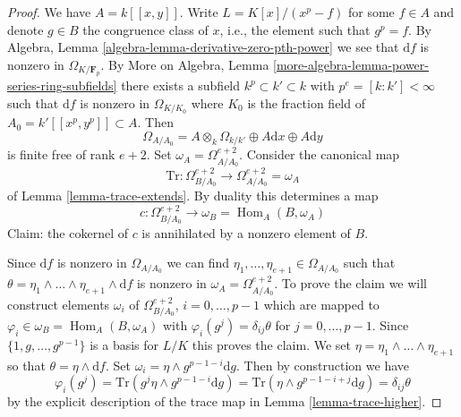 \documentclass{stacks-project}
\theoremstyle{plain}
\theoremstyle{definition}
\theoremstyle{remark}
\numberwithin{equation}{subsection}
\def\Hom{\mathop{\mathrm{Hom}}\nolimits}
\begin{document}
\begin{proof}
We have $A = k[[x, y]]$. Write $L = K[x]/(x^p - f)$ for some $f \in A$
and denote $g \in B$ the congruence class of $x$, i.e., the element such
that $g^p = f$. By Algebra, Lemma \ref{algebra-lemma-derivative-zero-pth-power}
we see that $\text{d}f$ is nonzero in $\Omega_{K/\mathbf{F}_p}$. By
More on Algebra, Lemma \ref{more-algebra-lemma-power-series-ring-subfields}
there exists a subfield $k^p \subset k' \subset k$ with
$p^e = [k : k'] < \infty$ such that $\text{d}f$ is nonzero
in $\Omega_{K/K_0}$ where $K_0$ is the fraction field of
$A_0 = k'[[x^p, y^p]] \subset A$. Then
$$
\Omega_{A/A_0} =
A \otimes_k \Omega_{k/k'} \oplus A \text{d}x \oplus A \text{d}y
$$
is finite free of rank $e + 2$. Set $\omega_A = \Omega^{e + 2}_{A/A_0}$.
Consider the canonical map
$$
\text{Tr} :
\Omega^{e + 2}_{B/A_0}
\longrightarrow
\Omega^{e + 2}_{A/A_0} = \omega_A
$$
of Lemma \ref{lemma-trace-extends}. By duality this determines a map
$$
c : \Omega^{e + 2}_{B/A_0} \to \omega_B = \Hom_A(B, \omega_A)
$$
Claim: the cokernel of $c$ is annihilated by a nonzero element of $B$.

\medskip\noindent
Since $\text{d}f$ is nonzero in $\Omega_{A/A_0}$ we can find
$\eta_1, \ldots, \eta_{e + 1} \in \Omega_{A/A_0}$ such that
$\theta = \eta_1 \wedge \ldots \wedge \eta_{e + 1} \wedge \text{d}f$ is
nonzero in $\omega_A = \Omega^{e + 2}_{A/A_0}$. To prove the claim we
will construct elements $\omega_i$ of $\Omega^{e + 2}_{B/A_0}$,
$i = 0, \ldots, p - 1$ which are mapped to
$\varphi_i \in \omega_B = \Hom_A(B, \omega_A)$
with $\varphi_i(g^j) = \delta_{ij}\theta$ for $j = 0, \ldots, p - 1$.
Since $\{1, g, \ldots, g^{p - 1}\}$ is a basis for $L/K$ this
proves the claim. We set
$\eta = \eta_1 \wedge \ldots \wedge \eta_{e + 1}$
so that $\theta = \eta \wedge \text{d}f$.
Set $\omega_i = \eta \wedge g^{p - 1 - i}\text{d}g$. Then
by construction we have
$$
\varphi_i(g^j) = \text{Tr}(g^j \eta \wedge g^{p - 1 - i}\text{d}g) =
\text{Tr}(\eta \wedge g^{p - 1 - i + j}\text{d}g) = \delta_{ij} \theta
$$
by the explicit description of the trace map in Lemma \ref{lemma-trace-higher}.


\end{proof}
\end{document}
